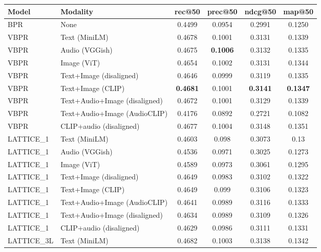 \begin{table}[H]
    \centering
    \begin{adjustbox}{max width=\textwidth}
    \begin{tabular}{|l|l|c|c|c|c|}
    \hline
    	\textbf{Model} & \textbf{Modality} & \textbf{rec@50} & \textbf{prec@50} & \textbf{ndcg@50} & \textbf{map@50} \\
    \hline
    BPR & None & 0.4499 & 0.0954 & 0.2991 & 0.1250 \\
    \hline
    VBPR & Text (MiniLM) & 0.4678 & 0.1001 & 0.3131 & 0.1339 \\
    \hline
    VBPR & Audio (VGGish) & 0.4675 & \textbf{0.1006} & 0.3132 & 0.1335 \\
    \hline
    VBPR & Image (ViT) & 0.4654 & 0.1002 & 0.3131 & 0.1344 \\
    \hline
    VBPR & Text+Image (disaligned) & 0.4646 & 0.0999 & 0.3119 & 0.1335 \\
    \hline
    VBPR & Text+Image (CLIP) & \textbf{0.4681} & 0.1001 & \textbf{0.3141} & \textbf{0.1347} \\
    \hline
    VBPR & Text+Audio+Image (disaligned) & 0.4672 & 0.1001 & 0.3129 & 0.1339 \\
    \hline
    VBPR & Text+Audio+Image (AudioCLIP) & 0.4176 & 0.0892 & 0.2721 & 0.1082 \\
    \hline
    VBPR & CLIP+audio (disaligned) & 0.4677 & 0.1004 & 0.3148 & 0.1351 \\
    \hline
    LATTICE\_1 & Text (MiniLM) & 0.4603 & 0.098 & 0.3073 & 0.13 \\
    \hline
    LATTICE\_1 & Audio (VGGish) & 0.4536 & 0.0971 & 0.3025 & 0.1273 \\
    \hline
    LATTICE\_1 & Image (ViT) & 0.4589 & 0.0973 & 0.3061 & 0.1295 \\
    \hline
    LATTICE\_1 & Text+Image (disaligned) & 0.4649 & 0.0983 & 0.3102 & 0.1322 \\
    \hline
    LATTICE\_1 & Text+Image (CLIP) & 0.4649 & 0.099 & 0.3106 & 0.1323 \\
    \hline
    LATTICE\_1 & Text+Audio+Image (AudioCLIP) & 0.4641 & 0.0989 & 0.3116 & 0.1333 \\
    \hline
    LATTICE\_1 & Text+Audio+Image (disaligned) & 0.4634 & 0.0989 & 0.3109 & 0.1326 \\
    \hline
    LATTICE\_1 & CLIP+audio (disaligned) & 0.4629 & 0.0986 & 0.3111 & 0.1331 \\
    \hline
    LATTICE\_3L & Text (MiniLM) & 0.4682 & 0.1003 & 0.3138 & 0.1342 \\

\end{tabular}
\end{adjustbox}
\end{table}
